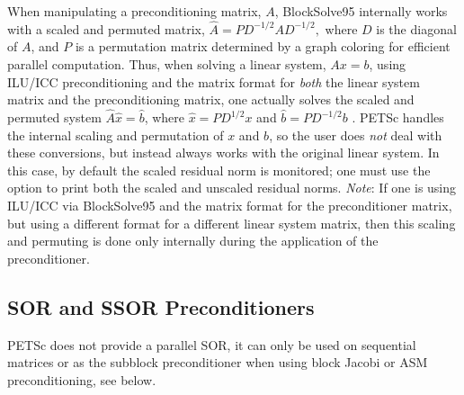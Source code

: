 When manipulating a preconditioning matrix, $ A $, BlockSolve95
internally works with a scaled and permuted matrix, $ \hat{A} = P
D^{-1/2} A D^{-1/2},$ where $ D $ is the diagonal of $ A $, and $ P $ is a
permutation matrix determined by a graph coloring for efficient
parallel computation.  Thus, when solving a linear system, $ Ax=b $,
using ILU/ICC preconditioning and the matrix format 
for {\em both} the linear system matrix and the preconditioning
matrix, one actually solves the scaled and permuted system $ \hat{A}
\hat{x} = \hat{b} $, where $ \hat{x} = P D^{1/2} x $ and $\hat{b} = P
D^{-1/2} b$ .  PETSc handles the internal scaling and permutation of
$ x $ and $ b $, so the user does {\em not} deal with these conversions, 
but instead always works with the original linear system.  In
this case, by default the scaled residual norm is monitored; one must use the
option   to print both the
scaled and unscaled residual norms. {\em Note}: If one is using ILU/ICC via
BlockSolve95 and the  matrix format for the 
preconditioner matrix, but using a different format for a different
linear system matrix, then this scaling and permuting is done only
internally during the application of the preconditioner.



\subsection{SOR and SSOR Preconditioners}

PETSc does not provide a parallel SOR, it can only be used on sequential 
matrices or as the subblock preconditioner when using block Jacobi or 
ASM preconditioning, see below.

